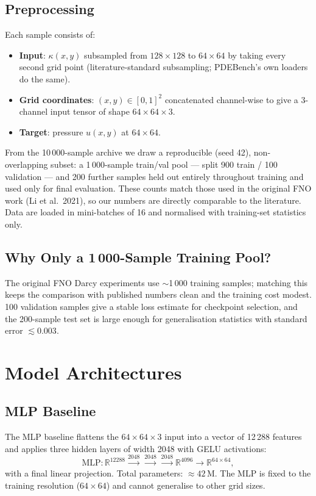 \documentclass[11pt,a4paper]{article}
\begin{document}
\subsection{Preprocessing}
Each sample consists of:
\begin{itemize}[nosep]
  \item \textbf{Input}: $\kappa(x,y)$ subsampled from $128\times128$ to $64\times64$ by taking every second grid point (literature-standard subsampling; PDEBench's own loaders do the same).
  \item \textbf{Grid coordinates}: $(x,y)\in[0,1]^2$ concatenated channel-wise to give a 3-channel input tensor of shape $64\times64\times3$.
  \item \textbf{Target}: pressure $u(x,y)$ at $64\times64$.
\end{itemize}

From the 10\,000-sample archive we draw a reproducible (seed 42), non-overlapping subset: a 1\,000-sample train/val pool --- split 900 train / 100 validation --- and 200 further samples held out entirely throughout training and used only for final evaluation. These counts match those used in the original FNO work (Li et al.\ 2021), so our numbers are directly comparable to the literature. Data are loaded in mini-batches of 16 and normalised with training-set statistics only.

\subsection{Why Only a 1\,000-Sample Training Pool?}
The original FNO Darcy experiments use $\sim$1\,000 training samples; matching this keeps the comparison with published numbers clean and the training cost modest. 100 validation samples give a stable loss estimate for checkpoint selection, and the 200-sample test set is large enough for generalisation statistics with standard error $\lesssim 0.003$.

\section{Model Architectures}

\subsection{MLP Baseline}
The MLP baseline flattens the $64\times64\times3$ input into a vector of 12\,288 features and applies three hidden layers of width 2048 with GELU activations:
\[
  \text{MLP}: \mathbb{R}^{12288} \xrightarrow{2048} \xrightarrow{2048} \xrightarrow{2048} \mathbb{R}^{4096} \to \mathbb{R}^{64\times64},
\]
with a final linear projection. Total parameters: $\approx 42$\,M. The MLP is fixed to the training resolution ($64\times64$) and cannot generalise to other grid sizes.
\end{document}
